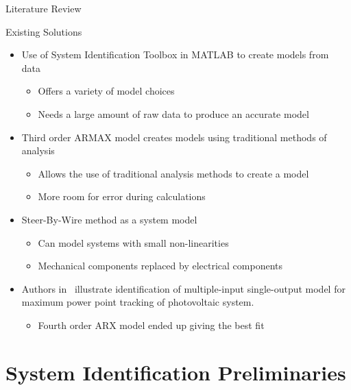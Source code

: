 \documentclass{beamer}
\begin{document}
\begin{frame}{Literature Review}{}
	\begin{block}{Existing Solutions}
 	\begin{itemize}
        \item Use of System Identification Toolbox in MATLAB to create models from data~\cite{Adnan2010}
	 \begin{itemize}
     \tiny
		    		\item Offers a variety of model choices
				\item Needs a large amount of raw data to produce an accurate model
	\end{itemize}
	\item Third order ARMAX model creates models using traditional methods of analysis~\cite{Li1999}
	 \begin{itemize}
     \tiny
		    		\item Allows the use of traditional analysis methods to create a model 
				\item More room for error during calculations
	\end{itemize}
	\item Steer-By-Wire method as a system model~\cite{Saruchi2015}
	 \begin{itemize}
     \tiny
		    		\item Can model systems with small non-linearities 
				\item Mechanical components replaced by electrical components 
	\end{itemize}
	\item Authors in~\cite{Hussain2011} illustrate identification of multiple-input single-output model for maximum power point tracking of photovoltaic system.  
	\begin{itemize}
    \tiny
		\item Fourth order ARX model ended up giving the best fit
	\end{itemize}
\end{itemize}
  \end{block}
\end{frame}
\section{System Identification Preliminaries}
\end{document}
